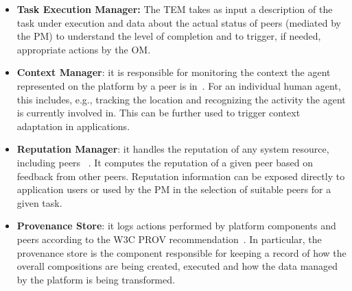 \begin{itemize}
\item \textbf{Task Execution Manager:} %
The TEM takes as input a description of the task under execution and data about the actual status of peers (mediated by the PM) to understand the level of completion and to trigger, if needed, appropriate actions by the OM.

\item \textbf{Context Manager}: it is responsible for monitoring the context the agent represented on the platform by a peer is in~\cite{D3.2}. For an individual human agent, this includes, e.g., tracking the location and recognizing the activity the agent is currently involved in. This can be further used to trigger context adaptation in applications. %

\item \textbf{Reputation Manager}: it handles the reputation of any system resource, including peers ~\cite{D2.3}. It computes the reputation of a given peer based on feedback from other peers.%
Reputation information can be exposed directly to application users or used by the PM in the selection of suitable peers for a given task. %


\item \textbf{Provenance Store}: it logs actions performed by platform
components and peers according to the W3C PROV recommendation~\cite{D2.2}. In particular, the provenance store is the component responsible for keeping a record of how the overall compositions are being created, executed and how the data managed by the platform is being transformed. %


\end{itemize}
